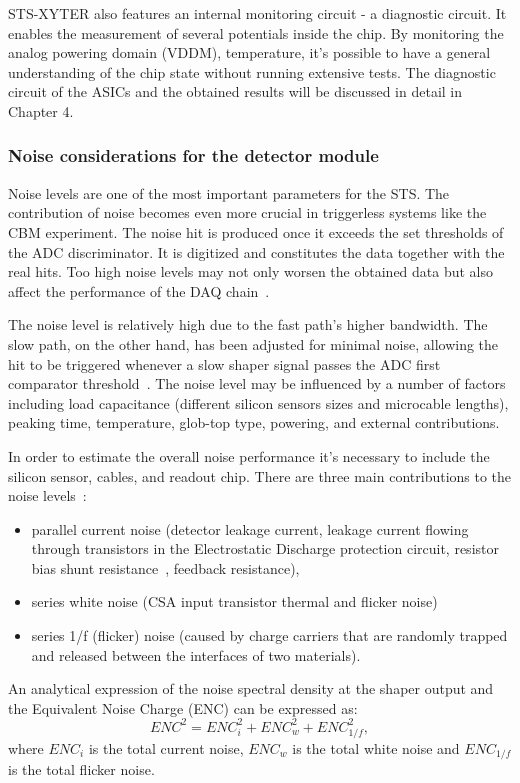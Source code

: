 STS-XYTER also features an internal monitoring circuit - a diagnostic circuit. It enables the measurement of several potentials inside the chip. By monitoring the analog powering domain (VDDM), temperature, it's possible to have a general understanding of the chip state without running extensive tests. The diagnostic circuit of the \glspl{ASIC} and the obtained results will be discussed in detail in Chapter 4.
\subsubsection{Noise considerations for the detector module}
Noise levels are one of the most important parameters for the \gls{STS}. The contribution of noise becomes even more crucial in triggerless systems like the \gls{CBM} experiment. The noise hit is produced once it exceeds the set thresholds of the \gls{ADC} discriminator. It is digitized and constitutes the data together with the real hits. Too high noise levels may not only worsen the obtained data but also affect the performance of the \gls{DAQ} chain~\cite{Heuser:54798}.

The noise level is relatively high due to the fast path's higher bandwidth. The slow path, on the other hand, has been adjusted for minimal noise, allowing the hit to be triggered whenever a slow shaper signal passes the ADC first comparator threshold~\cite{RodriguezRodriguez2020}. The noise level may be influenced by a number of factors including load capacitance 
(different silicon sensors sizes and microcable lengths), peaking time, temperature, glob-top type, powering, and external contributions.

In order to estimate the overall noise performance it's necessary to include the silicon sensor, cables, and readout chip. There are three main contributions to the noise levels~\cite{Toia:209729}:
\begin{itemize}
    \item parallel current noise (detector leakage current, leakage current flowing through transistors in the Electrostatic Discharge protection circuit, resistor bias shunt resistance~\cite{Spieler}, feedback resistance),
    \item series white noise (\gls{CSA} input transistor thermal and flicker noise)
    \item series 1/f (flicker) noise (caused by charge carriers that are randomly trapped and released between the interfaces of two materials).
\end{itemize}
An analytical expression of the noise spectral density at the shaper output and the Equivalent Noise Charge (\gls{ENC}) can be expressed as:
\begin{equation}
    ENC^{2} = ENC^{2}_{i} + ENC^{2}_{w} + ENC^{2}_{1/f},
\end{equation}
where $ENC_{i}$  is the total current noise, $ ENC_{w}$ is the total white noise and $ENC_{1/f}$ is the total flicker noise. 

